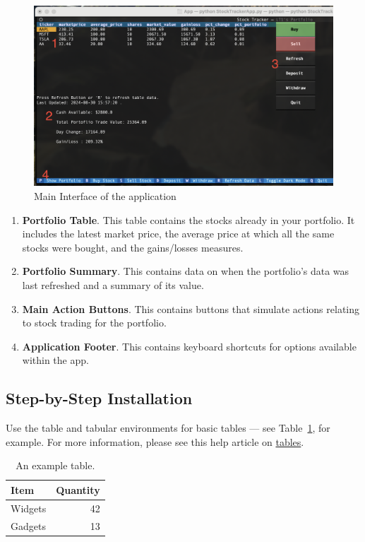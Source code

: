 \documentclass{article}
\begin{document}
\begin{figure}
    \centering
    \includegraphics[width=1\linewidth]{MainWindow.png}
    \caption{Main Interface of the application}
    \label{fig:1}
\end{figure}

\begin{enumerate}
    \item \textbf{Portfolio Table}. This table contains the stocks already in your portfolio. It includes the latest market price, the average price at which all the same stocks were bought, and the gains/losses measures.
    \item \textbf{Portfolio Summary}. This contains data on when the portfolio's data was last refreshed and a summary of its value.
    \item \textbf{Main Action Buttons}. This  contains buttons that simulate actions relating to stock trading for the portfolio. 
    \item \textbf{Application Footer}. This contains keyboard shortcuts for options available within the app. 
\end{enumerate}

\subsection{Step-by-Step Installation}

Use the table and tabular environments for basic tables --- see Table~\ref{tab:widgets}, for example. For more information, please see this help article on \href{https://www.overleaf.com/learn/latex/tables}{tables}. 

\begin{table}
\centering
\begin{tabular}{l|r}
Item & Quantity \\\hline
Widgets & 42 \\
Gadgets & 13
\end{tabular}
\caption{\label{tab:widgets}An example table.}
\end{table}
\end{document}
